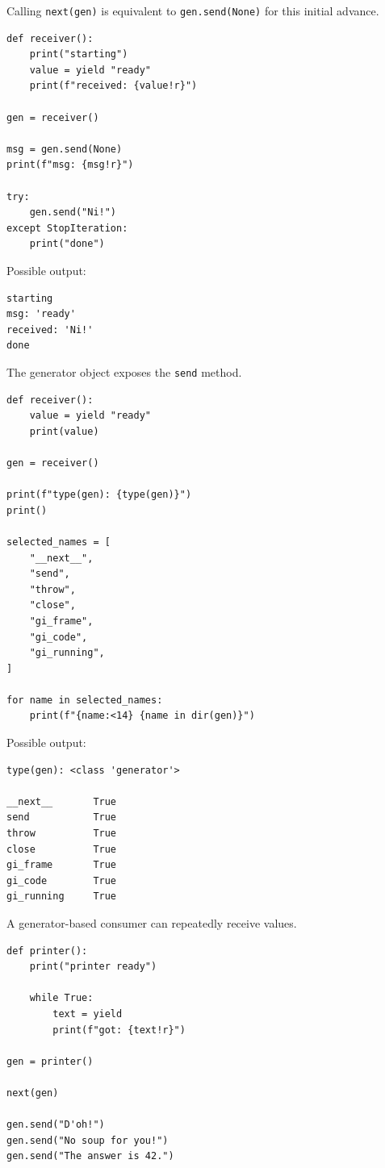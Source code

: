 Calling \texttt{next(gen)} is equivalent to \texttt{gen.send(None)} for this initial advance.

\begin{verbatim}
def receiver():
    print("starting")
    value = yield "ready"
    print(f"received: {value!r}")

gen = receiver()

msg = gen.send(None)
print(f"msg: {msg!r}")

try:
    gen.send("Ni!")
except StopIteration:
    print("done")
\end{verbatim}

Possible output:

\begin{verbatim}
starting
msg: 'ready'
received: 'Ni!'
done
\end{verbatim}

The generator object exposes the \texttt{send} method.

\begin{verbatim}
def receiver():
    value = yield "ready"
    print(value)

gen = receiver()

print(f"type(gen): {type(gen)}")
print()

selected_names = [
    "__next__",
    "send",
    "throw",
    "close",
    "gi_frame",
    "gi_code",
    "gi_running",
]

for name in selected_names:
    print(f"{name:<14} {name in dir(gen)}")
\end{verbatim}

Possible output:

\begin{verbatim}
type(gen): <class 'generator'>

__next__       True
send           True
throw          True
close          True
gi_frame       True
gi_code        True
gi_running     True
\end{verbatim}

A generator-based consumer can repeatedly receive values.

\begin{verbatim}
def printer():
    print("printer ready")

    while True:
        text = yield
        print(f"got: {text!r}")

gen = printer()

next(gen)

gen.send("D'oh!")
gen.send("No soup for you!")
gen.send("The answer is 42.")
\end{verbatim}

